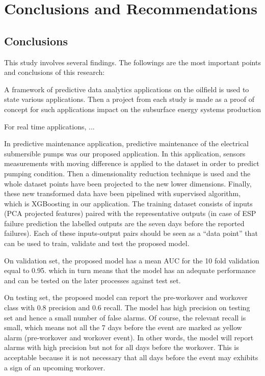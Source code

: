 \chapter{Conclusions and Recommendations}

\section{Conclusions} 
This study involves several findings. The followings are the most important points and conclusions of this research:

A framework of predictive data analytics applications on the oilfield is used to state various applications. Then a project from each study is made as a proof of concept for such applications impact on the subsurface energy systems production

For real time applications,  ...

In predictive maintenance application, predictive maintenance of the electrical submersible pumps was our proposed application. In this application, sensors measurements with moving difference is applied to the dataset in order to predict pumping condition. Then a dimensionality reduction technique is used and the whole dataset points have been projected to the new lower dimensions. Finally, these new transformed data have been pipelined with supervised algorithm, which is XGBoosting in our application. The training dataset consists of inputs (PCA projected features) paired with the representative outputs (in case of ESP failure prediction the labelled outputs are the seven days before the reported failures). Each of these inputs-output pairs should be seen as a “data point” that can be used to train, validate and test the proposed model. 

On validation set,  the proposed model has a mean AUC for the 10 fold validation equal to 0.95. which in turn means that the model has an adequate performance and can be tested on the later processes against test set. 

On testing set, the proposed model can report the pre-workover and workover class with 0.8 precision and 0.6 recall. The model has high precision on testing set and hence a small number of false alarms. Of course, the relevant recall is small, which means not all the 7 days before the event are marked as yellow alarm (pre-workover and workover event). In other words, the model will report alarms with high precision but not for all days before the workover. This is acceptable because it is not necessary that all days before the event may exhibits a sign of an upcoming workover.     

